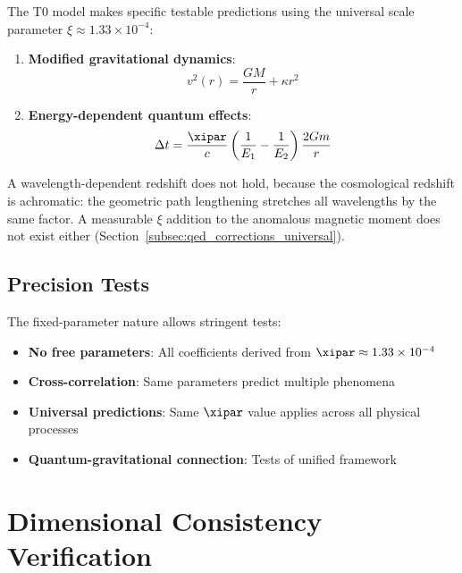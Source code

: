 	The T0 model makes specific testable predictions using the universal scale parameter $\xi \approx 1.33 \times 10^{-4}$:
	
	\begin{enumerate}
		\item \textbf{Modified gravitational dynamics}:
		\begin{equation}
			v^2(r) = \frac{GM}{r} + \kappa r^2
			\label{eq:rotation_curve_prediction}
		\end{equation}
		
		\item \textbf{Energy-dependent quantum effects}:
		\begin{equation}
			\Delta t = \frac{\xipar}{c} \left(\frac{1}{E_1} - \frac{1}{E_2}\right) \frac{2Gm}{r}
			\label{eq:quantum_time_delay}
		\end{equation}
	\end{enumerate}
	
	A wavelength-dependent redshift does not hold, because the cosmological redshift is achromatic: the geometric path lengthening stretches all wavelengths by the same factor. A measurable $\xi$ addition to the anomalous magnetic moment does not exist either (Section~\ref{subsec:qed_corrections_universal}).
	
	\subsection{Precision Tests}
	\label{subsec:precision_tests}
	
	The fixed-parameter nature allows stringent tests:
	\begin{itemize}
		\item \textbf{No free parameters}: All coefficients derived from $\xipar \approx 1.33 \times 10^{-4}$
		\item \textbf{Cross-correlation}: Same parameters predict multiple phenomena
		\item \textbf{Universal predictions}: Same $\xipar$ value applies across all physical processes
		\item \textbf{Quantum-gravitational connection}: Tests of unified framework
	\end{itemize}
	
	\section{Dimensional Consistency Verification}
	\label{sec:dimensional_verification}
	
